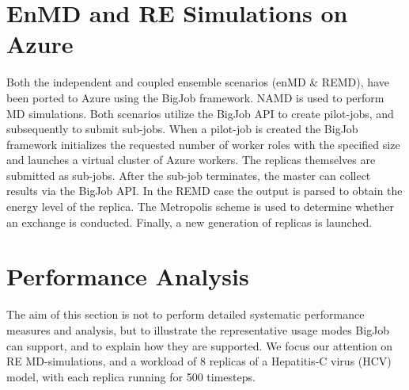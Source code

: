 \documentclass[conference,final]{IEEEtran}
\newcommand{\up}{\vspace*{-1em}}
\newcommand{\numrep}{8 }
\newcommand{\alnote}[1]{ {\textcolor{blue} { ***AL: #1 }}}
\newcommand{\jhanote}[1]{ {\textcolor{red} { ***SJ: #1 }}}
\newcommand{\alnote}[1]{}
\newcommand{\jhanote}[1]{}
\begin{document}
\up
\section{EnMD and RE Simulations on Azure}
\label{sec:enMD-REMD}
\up Both the independent and coupled ensemble scenarios (enMD \&
REMD), have been ported to Azure using the BigJob framework.  NAMD is
used to perform MD simulations.  Both scenarios utilize the BigJob API
to create pilot-jobs, and subsequently to submit sub-jobs. When a
pilot-job is created the BigJob framework initializes the requested
number of worker roles with the specified size and launches a virtual
cluster of Azure workers. The replicas
themselves are submitted as sub-jobs.  After the sub-job terminates,
the master can collect results via the BigJob API.  In the REMD case
the output is parsed to obtain the energy level of the replica.  The
Metropolis scheme is used to determine whether an exchange is
conducted. Finally, a new generation of replicas is launched.




\up
\section{Performance Analysis}
\label{sec:performance}
\up The aim of this section is not to perform detailed systematic
performance measures and analysis, but to illustrate the
representative usage modes BigJob can support, and to explain how they
are supported.  %
We focus our attention on RE MD-simulations, and a workload of \numrep
replicas of a Hepatitis-C virus (HCV) model, with each replica running
for 500 timesteps.  \up
\end{document}
